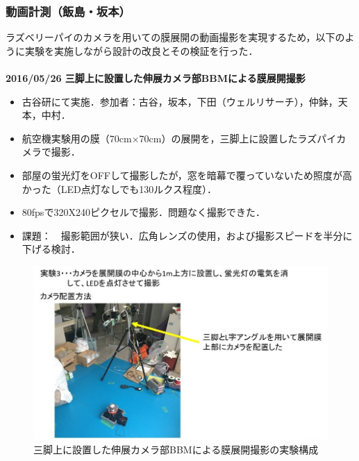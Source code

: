 \subsubsection{動画計測（飯島・坂本）}

ラズベリーパイのカメラを用いての膜展開の動画撮影を実現するため，以下のように実験を実施しながら設計の改良とその検証を行った．\\
\\

\noindent \textbf{2016/05/26 三脚上に設置した伸展カメラ部BBMによる膜展開撮影}
\begin{itemize}
	\item 古谷研にて実施．参加者：古谷，坂本，下田（ウェルリサーチ），仲鉢，天本，中村．
	\item 航空機実験用の膜（70cm×70cm）の展開を，三脚上に設置したラズパイカメラで撮影．
	\item 部屋の蛍光灯をOFFして撮影したが，窓を暗幕で覆っていないため照度が高かった（LED点灯なしでも130ルクス程度）．
	\item 80fpsで320X240ピクセルで撮影．問題なく撮影できた．
	\item 課題：　撮影範囲が狭い．広角レンズの使用，および撮影スピードを半分に下げる検討．
\end{itemize}
\begin{figure}[H]
	\centering
	\includegraphics[width=.9\textwidth]{03/fig/3-9-2-3-1.jpg}
	\caption{三脚上に設置した伸展カメラ部BBMによる膜展開撮影の実験構成}
	\label{fig3-9-2-3-1}
\end{figure}
